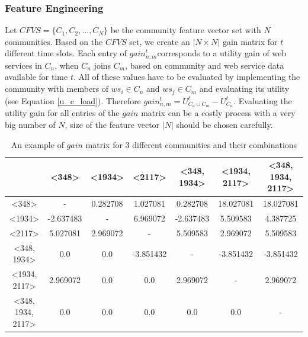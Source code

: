 \subsubsection{Feature Engineering}\label{sss:feng}
Let $CFVS = \{C_1, C_2,..., C_N\}$ be the community feature vector set with $N$ communities. Based on the $CFVS$ set, we create an $|N \times N|$ gain matrix for $t$ different time slots. Each entry of $gain_{n,m}^{t}$corresponds to a utility gain of web services in $C_n$, when $C_n$ joins $C_m$, based on community and web service data available for time $t$. All of these values have to be evaluated by implementing the community with members of $ws_i \in C_n$ and $ws_j \in C_m$ and evaluating its utility (see Equation \ref{u_c_load}). Therefore $gain_{n,m}^{t} = U_{C_n \cup C_m}^{t} - U_{C_{n}}^{t}$. Evaluating the utility gain for all entries of the $gain$ matrix can be a costly process with a very big number of $N$, size of the feature vector $|N|$ should be chosen carefully.

\begin{table}[ht]
\caption{An example of $gain$ matrix for 3 different communities and their combinations} %
\centering %
{\renewcommand{\arraystretch}{1.2}
\begin{tabular}{c|c c c c c c} %
\hline\hline %
 & \textless348\textgreater & \textless1934\textgreater & \textless2117\textgreater & \textless348, 1934\textgreater & \textless1934, 2117\textgreater & \textless348, 1934, 2117\textgreater \\ [0.5ex] %
\hline %
\textless348\textgreater & - & 0.282708 & 1.027081 & 0.282708 & 18.027081 & 18.027081 \\
\textless1934\textgreater & -2.637483 & - & 6.969072 & -2.637483 & 5.509583 & 4.387725 \\
\textless2117\textgreater & 5.027081 & 2.969072 & - & 5.509583 & 2.969072 & 5.509583 \\
\textless348, 1934\textgreater & 0.0 & 0.0 & -3.851432 & - & -3.851432 & -3.851432 \\
\textless1934, 2117\textgreater & 2.969072 & 0.0 & 0.0 & 2.969072 & - & 2.969072 \\
\textless348, 1934, 2117\textgreater & 0.0 & 0.0 & 0.0 & 0.0 & 0.0 & - \\ [1ex] %
\hline %
\end{tabular}
}
\label{table:nonlin} %
\end{table}

